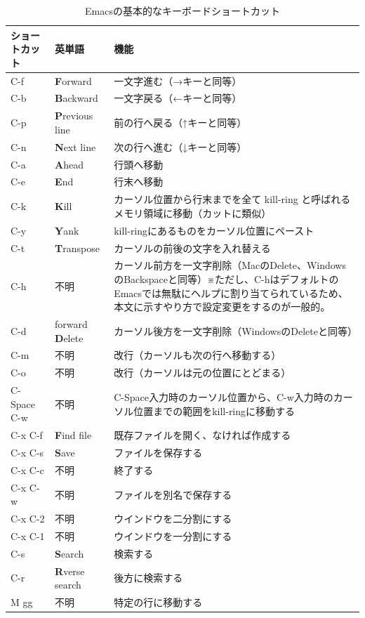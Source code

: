 \begin{table}
  \centering
  \caption{Emacsの基本的なキーボードショートカット}
  \label{tab_emacs}
  \begin{tabular}{llp{10cm}}
  \hline
ショートカット & 英単語 & 機能 \\ \hline\hline
C-f & {\bf F}orward & 一文字進む（→キーと同等） \\
C-b & {\bf B}ackward & 一文字戻る（←キーと同等） \\
C-p & {\bf P}revious line & 前の行へ戻る（↑キーと同等） \\
C-n & {\bf N}ext line & 次の行へ進む（↓キーと同等） \\
C-a & {\bf A}head & 行頭へ移動 \\
C-e & {\bf E}nd & 行末へ移動 \\
C-k & {\bf K}ill & カーソル位置から行末までを全て kill-ring と呼ばれるメモリ領域に移動（カットに類似） \\
C-y & {\bf Y}ank & kill-ringにあるものをカーソル位置にペースト \\
C-t & {\bf T}ranspose & カーソルの前後の文字を入れ替える \\
C-h & 不明 & カーソル前方を一文字削除（MacのDelete、WindowsのBackspaceと同等）※ただし、C-hはデフォルトのEmacsでは無駄にヘルプに割り当てられているため、本文に示すやり方で設定変更をするのが一般的。 \\
C-d & forward {\bf D}elete & カーソル後方を一文字削除（WindowsのDeleteと同等） \\
C-m & 不明 & 改行（カーソルも次の行へ移動する） \\
C-o & 不明 & 改行（カーソルは元の位置にとどまる） \\
C-Space C-w & 不明 & C-Space入力時のカーソル位置から、C-w入力時のカーソル位置までの範囲をkill-ringに移動する \\ \hline
C-x C-f & {\bf F}ind file & 既存ファイルを開く、なければ作成する \\
C-x C-s & {\bf S}ave & ファイルを保存する \\
C-x C-c & 不明 & 終了する \\
C-x C-w & 不明 & ファイルを別名で保存する \\
C-x C-2 & 不明 & ウインドウを二分割にする \\
C-x C-1 & 不明 & ウインドウを一分割にする \\
C-s & {\bf S}earch & 検索する \\
C-r & {\bf R}verse search & 後方に検索する \\
M gg & 不明 & 特定の行に移動する\\\hline
  \end{tabular}
\end{table}

